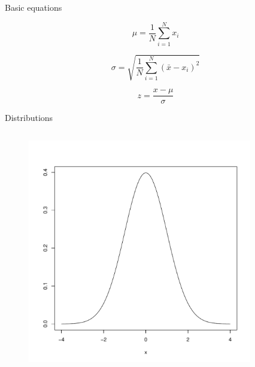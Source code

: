 \documentclass[pdf]{beamer}
\begin{document}
\begin{frame}{Basic equations}
  
  $$
  \mu = \frac{1}{N} \sum_{i=1}^{N} x_i
  $$
  
  $$
  \sigma=\sqrt{\frac{1}{N} \sum_{i=1}^N(\bar{x}-x_i)^2}
  $$

  $$
  z = \frac{x - \mu}{\sigma}
  $$
\end{frame}

\begin{frame}{Distributions}
  \begin{columns}
    \begin{column}{0.5\textwidth}
      \begin{figure}[ht]
      \includegraphics[width=\textwidth]{images/normal.pdf}
      \end{figure}
    \end{column}
    \begin{column}{0.5\textwidth}
      \begin{figure}[ht]

\end{figure}
\end{column}
\end{columns}
\end{frame}
\end{document}
